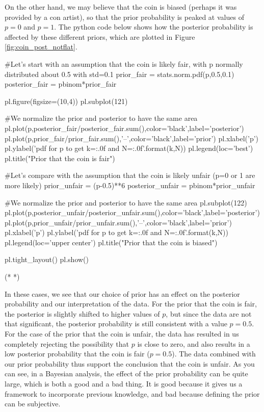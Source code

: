 On the other hand, we may believe that the coin is biased (perhaps it was provided by a con artist), so that the prior probability is peaked at values of $p=0$ and $p=1$. The python code below shows how the posterior probability is affected by these different priors, which are plotted in Figure \ref{fig:coin_post_notflat}.
\begin{python}[caption = Posterior probability for a coin toss with different priors]
#Let's start with an assumption that the coin is likely fair, with p normally distributed about 0.5 with std=0.1
prior_fair = stats.norm.pdf(p,0.5,0.1)
posterior_fair = pbinom*prior_fair

pl.figure(figsize=(10,4))
pl.subplot(121)

#We normalize the prior and posterior to have the same area
pl.plot(p,posterior_fair/posterior_fair.sum(),color='black',label='posterior')
pl.plot(p,prior_fair/prior_fair.sum(),'--',color='black',label='prior')
pl.xlabel('p')
pl.ylabel('pdf for p to get k={:.0f} and N={:.0f}'.format(k,N))
pl.legend(loc='best')
pl.title("Prior that the coin is fair")

#Let's compare with the assumption that the coin is likely unfair (p=0 or 1 are more likely)
prior_unfair = (p-0.5)**6
posterior_unfair = pbinom*prior_unfair

#We normalize the prior and posterior to have the same area
pl.subplot(122)
pl.plot(p,posterior_unfair/posterior_unfair.sum(),color='black',label='posterior')
pl.plot(p,prior_unfair/prior_unfair.sum(),'--',color='black',label='prior')
pl.xlabel('p')
pl.ylabel('pdf for p to get k={:.0f} and N={:.0f}'.format(k,N))
pl.legend(loc='upper center')
pl.title("Prior that the coin is biased")

pl.tight_layout()
pl.show()
\end{python}
\begin{poutput}
(*  *)
\end{poutput}

In these cases, we see that our choice of prior has an effect on the posterior probability and our interpretation of the data. For the prior that the coin is fair, the posterior is slightly shifted to higher values of $p$, but since the data are not that significant, the posterior probability is still consistent with a value $p=0.5$. For the case of the prior that the coin is unfair, the data has resulted in us completely rejecting the possibility that $p$ is close to zero, and also results in a low posterior probability that the coin is fair ($p=0.5$). The data combined with our prior probability thus support the conclusion that the coin is unfair. As you can see, in a Bayesian analysis, the effect of the prior probability can be quite large, which is both a good and a bad thing. It is good because it gives us a framework to incorporate previous knowledge, and bad because defining the prior can be subjective.

